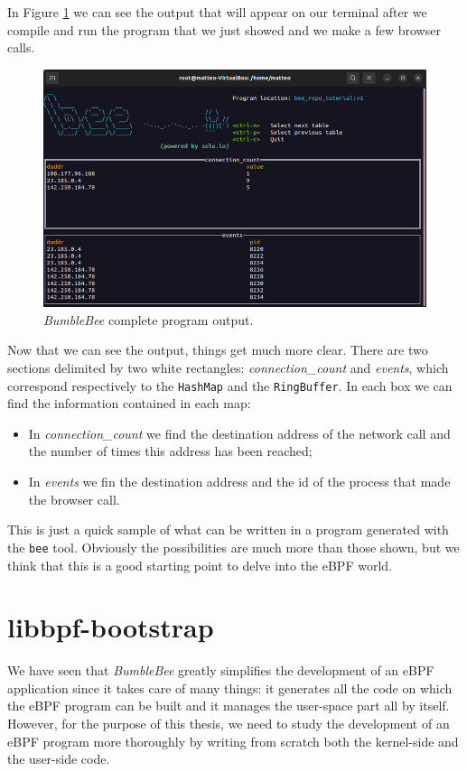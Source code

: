 In Figure \ref{fig:bee_compelte_program_output} we can see the output that will appear on our terminal after we compile and run the program that we just showed and we make a few browser calls.

\begin{figure}[h]
	\centering
	\includegraphics[width=0.7\linewidth]{images/LinuxDevelopment/bee_repo_tut_display.png}
	\caption{\textit{BumbleBee} complete program output.}
	\label{fig:bee_compelte_program_output}
\end{figure}

Now that we can see the output, things get much more clear.
There are two sections delimited by two white rectangles: \textit{connection\_count} and \textit{events}, which correspond respectively to the \verb|HashMap| and the \verb|RingBuffer|.
In each box we can find the information contained in each map:

\begin{itemize}
	\item In \textit{connection\_count} we find the destination address of the network
		call and the number of times this address has been reached;
	\item In \textit{events} we fin the destination address and the id of the process 
		that made the browser call.
\end{itemize}

This is just a quick sample of what can be written in a program generated with the \verb|bee| tool.
Obviously the possibilities are much more than those shown, but we think that this is a good starting point to delve into the eBPF world.

\section{libbpf-bootstrap}

We have seen that \textit{BumbleBee} greatly simplifies the development of an eBPF application since it takes care of many things: it generates all the code on which the eBPF program can be built and it manages the user-space part all by itself.
However, for the purpose of this thesis, we need to study the development of an eBPF program more thoroughly by writing from scratch both the kernel-side and the user-side code.

